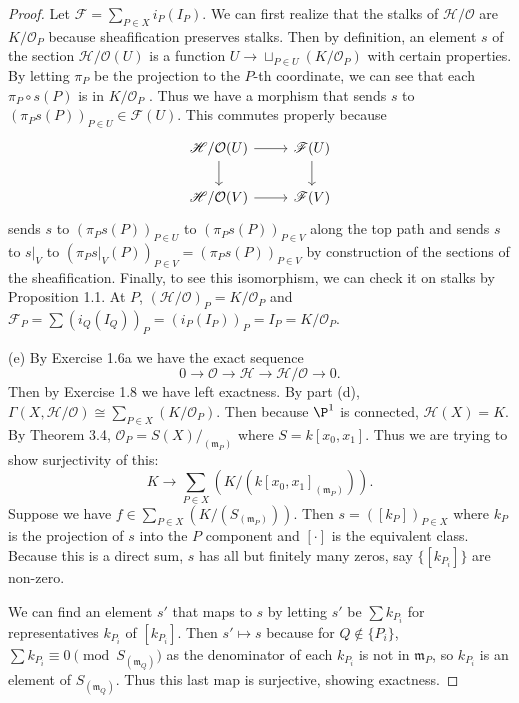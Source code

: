 \begin{proof}
	Let $\mathscr{F} = \sum_{P\in X}i_P(I_P) $.
	We can first realize that the stalks of $\mathscr{H} / \mathcal{O} $ are $K / \mathcal{O}_P$ because sheafification preserves stalks.
	Then by definition, an element $s $ of the section $\mathscr{H} / \mathcal{O} (U)$ is a function $U \to \sqcup_{P\in U} (K / \mathcal{O}_P)$ with certain properties.
	By letting $\pi _P $ be the projection to the $P $-th coordinate, we can see that each $\pi_P\circ s (P)$ is in $K / \mathcal{O}_P $ .
	Thus we have a morphism that sends $s $ to $(\pi_Ps(P))_{P\in U} \in \mathscr{F}(U) $.
	This commutes properly because
	\[
	\begin{tikzcd}
	\mathscr{H} / \mathcal{O}(U) & \mathscr{F}(U)\\
	\mathscr{H} / \mathcal{O}(V) & \mathscr{F}(V)
	\arrow[from=1-1,to=1-2]
	\arrow[from=1-1,to=2-1]
	\arrow[from=2-1,to=2-2]
	\arrow[from=1-2,to=2-2]
	\end{tikzcd}
	\]
	sends $s $ to $(\pi _Ps(P))_{P\in U}$ to $(\pi _Ps(P))_{P \in V} $ along the top path and sends $s $ to $s|_V $ to $(\pi _Ps|_V(P))_{P \in V} = (\pi _Ps(P))_{P\in V} $ by construction of the sections of the sheafification.
	Finally, to see this isomorphism, we can check it on stalks by Proposition 1.1.
	At $P $, $(\mathscr{H} / \mathcal{O})_P = K / \mathcal{O}_P$ and $\mathscr{F}_P = \sum (i_Q(I_Q))_P = (i_P(I_P))_P = I_P = K / \mathcal{O}_P$.

	(e) 
	By Exercise 1.6a we have the exact sequence
	\[
		0 \to \mathcal{O} \to \mathscr{H} \to \mathscr{H} / \mathcal{O} \to 0
	.\] 
	Then by Exercise 1.8 we have left exactness.
	By part (d), $\Gamma(X,\mathscr{H} / \mathcal{O}) \cong \sum_{P \in X} (K / \mathcal{O}_P)$.
	Then because $\P^1 $ is connected, $\mathscr{H}(X) = K $.
	By Theorem 3.4, $\mathcal{O}_P = S(X) /_{(\mathfrak{m}_P)} $ where $S = k[x_{0},x_{1}] $.
	Thus we are trying to show surjectivity of this:
	\[
		K \to \sum_{P \in X} (K / (k[x_{0},x_{1}]_{(\mathfrak{m}_P)}))
	.\] 
	Suppose we have $f \in \sum_{P \in X} (K / (S_{(\mathfrak{m}_P)})) $.
	Then $s = ([k_P])_{P\in X}$ where $k_P $ is the projection of $s $ into the $P $ component and $[\cdot] $ is the equivalent class.
	Because this is a direct sum, $s $ has all but finitely many zeros, say $\{[k_{P_i}]\} $ are non-zero.

	We can find an element $s' $ that maps to $s $ by letting $s' $ be $\sum k_{P_i} $ for representatives $k_{P_i} $ of $[k_{P_i}] $.
	Then $s' \mapsto s $ because for $Q \notin \{P_i\}   $, $\sum k_{P_i} \equiv 0 \pmod{S_{(\mathfrak{m}_Q)}}$ as the denominator of each $k_{P_i} $ is not in $\mathfrak{m}_P $, so $k_{P_i} $ is an element of $S_{(\mathfrak{m}_Q)} $.
	Thus this last map is surjective, showing exactness.
\end{proof}

